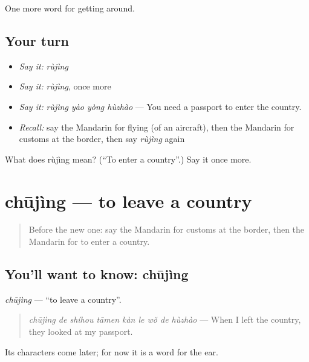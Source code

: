 \begin{grammarlens}[title={What you've built}]
One more word for getting around.
\end{grammarlens}

\subsection*{Your turn}
\begin{itemize}
\raggedright
  \item \emph{Say it:} \emph{rùjìng}
  \item \emph{Say it:} \emph{rùjìng}, once more
  \item \emph{Say it:} \emph{rùjìng yào yòng hùzhào} — You need a passport to enter the country.
  \item \emph{Recall:} say the Mandarin for flying (of an aircraft), then the Mandarin for customs at the border, then say \emph{rùjìng} again
\end{itemize}

\begin{tcolorbox}[breakable,colback=teal!4,colframe=teal!35!black,title={Before you move on}]
What does rùjìng mean? (\textquotedblleft{}To enter a country\textquotedblright{}.) Say it once more.
\end{tcolorbox}
\section[chūjìng]{chūjìng — to leave a country}

\label{lesson:ZH-C417-chujing}



\begin{quote}
Before the new one: say the Mandarin for customs at the border, then the Mandarin for to enter a country.
\end{quote}

\subsection*{You'll want to know: chūjìng}
\emph{chūjìng} — \textquotedblleft{}to leave a country\textquotedblright{}.

\begin{quote}
\emph{chūjìng de shíhou tāmen kàn le wǒ de hùzhào} — When I left the country, they looked at my passport.
\end{quote}

Its characters come later; for now it is a word for the ear.

